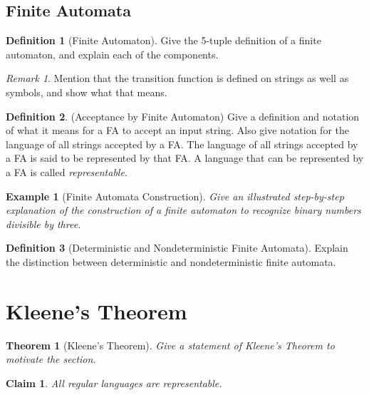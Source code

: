 \documentclass[12 pt, twoside, letterpaper]{article}
\theoremstyle{definition}
\newtheorem{definition}{Definition}
\theoremstyle{remark}
\newtheorem*{remark}{Remark}
\theoremstyle{plain}
\newtheorem*{example}{Example}
\newtheorem{theorem}{Theorem}
\newtheorem{claim}{Claim}
\begin{document}
	\subsection{Finite Automata} %
	\label{sub:finite_automata}
	
		\begin{definition}[Finite Automaton]
			Give the 5-tuple definition of a finite automaton, and explain each of the components.
		\end{definition}

		\begin{remark}
			Mention that the transition function is defined on strings as well as symbols, and show what that means.
		\end{remark}

		\begin{definition}(Acceptance by Finite Automaton)
			Give a definition and notation of what it means for a FA to accept an input string.
			Also give notation for the language of all strings accepted by a FA.
			The language of all strings accepted by a FA is said to be represented by that FA.
			A language that can be represented by a FA is called \textit{representable}.
		\end{definition}

		\begin{example}[Finite Automata Construction]
			Give an illustrated step-by-step explanation of the construction of a finite automaton to recognize binary numbers divisible by three.
		\end{example}

		\begin{definition}[Deterministic and Nondeterministic Finite Automata]
			Explain the distinction between deterministic and nondeterministic finite automata.
		\end{definition}



\section{Kleene's Theorem} %
\label{sec:kleenes_theorem}

	\begin{theorem}[Kleene's Theorem]
		Give a statement of Kleene's Theorem to motivate the section.
	\end{theorem}

	\begin{claim}
	\label{prop:regular_languages_representable}
		All regular languages are representable.
	\end{claim}
\end{document}
